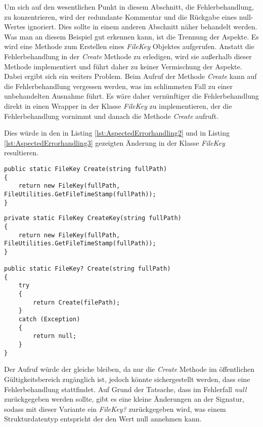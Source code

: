 \SuperPar Um sich auf den wesentlichen Punkt in diesem Abschnitt, die Fehlerbehandlung, zu konzentrieren, wird der redundante Kommentar und die Rückgabe eines null-Wertes ignoriert. Dies sollte in einem anderen Abschnitt näher behandelt werden. %
Was man an diesem Beispiel gut erkennen kann, ist die Trennung der Aspekte. Es wird eine Methode zum Erstellen eines \textit{FileKey} Objektes aufgerufen. Anstatt die Fehlerbehandlung in der \textit{Create} Methode zu erledigen, wird sie außerhalb dieser Methode implementiert und führt daher zu keiner Vermischung der Aspekte. Dabei ergibt sich ein weiters Problem. Beim Aufruf der Methode \textit{Create} kann auf die Fehlerbehandlung vergessen werden, was im schlimmsten Fall zu einer unbehandelten Ausnahme führt. Es wäre daher vernünftiger die Fehlerbehandlung direkt in einen Wrapper in der Klasse \textit{FileKey} zu implementieren, der die Fehlerbehandlung vornimmt und danach die Methode \textit{Create} aufruft.

\SuperPar Dies würde in den in Listing \ref{lst:AspectedErrorhandling2} und in Listing \ref{lst:AspectedErrorhandling3} gezeigten Änderung in der Klasse \textit{FileKey} resultieren.

\begin{lstlisting}[language={[Sharp]C}, caption=Fehlerbehandlung in der Klasse FileKey vorher, label=lst:AspectedErrorhandling2]
public static FileKey Create(string fullPath)
{
	return new FileKey(fullPath, FileUtilities.GetFileTimeStamp(fullPath));
}
\end{lstlisting}

\begin{lstlisting}[language={[Sharp]C}, caption=Fehlerbehandlung in der Klasse FileKey nachher, label=lst:AspectedErrorhandling3]
private static FileKey CreateKey(string fullPath)
{
	return new FileKey(fullPath, FileUtilities.GetFileTimeStamp(fullPath));
}
				
public static FileKey? Create(string fullPath)
{
	try
	{
		return Create(filePath);
	}
	catch (Exception)
	{
		return null;
	}
}
\end{lstlisting}

\SuperPar Der Aufruf würde der gleiche bleiben, da nur die \textit{Create} Methode im öffentlichen Gültigkeitsbereich zugänglich ist, jedoch könnte sichergestellt werden, dass eine Fehlerbehandlung stattfindet. Auf Grund der Tatsache, dass im Fehlerfall \textit{null} zurückgegeben werden sollte, gibt es eine kleine Änderungen an der Signatur, sodass mit dieser Variante ein \textit{FileKey?} zurückgegeben wird, was einem Strukturdatentyp entspricht der den Wert null annehmen kann. 

